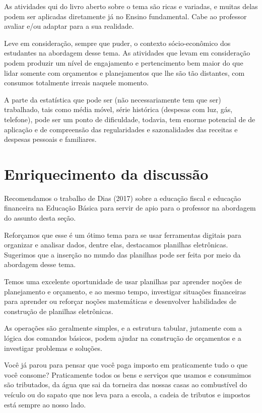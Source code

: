 \begin{paginatexto}
As atividades qui do livro aberto sobre o tema são ricas e variadas, e muitas delas podem ser aplicadas diretamente já no Ensino fundamental. Cabe ao professor avaliar e/ou adaptar para a sua realidade. 

Leve em consideração, sempre que puder, o contexto sócio-econômico dos estudantes na abordagem desse tema. As atividades que levam em consideração podem produzir um nível de engajamento e pertencimento bem maior do que lidar somente com orçamentos e planejamentos que lhe são tão distantes, com consumos totalmente irreais naquele momento. 

A parte da estatística que pode ser (não necessariamente tem que ser) trabalhado, tais como média móvel, série histórica (despesas com luz, gás, telefone), pode ser um ponto de dificuldade, todavia, tem enorme potencial de de aplicação e de compreensão das regularidades e sazonalidades das receitas e despesas pessoais e familiares.

\section*{Enriquecimento da discussão}

Recomendamos o trabalho de Dias (2017) sobre a educação fiscal e educação financeira na Educação Básica para servir de apio para o professor na abordagem do assunto desta seção.

Reforçamos que esse é um ótimo tema para se usar ferramentas digitais para organizar e analisar dados, dentre elas, destacamos planilhas eletrônicas. Sugerimos que a inserção no mundo das planilhas pode ser feita por meio da abordagem desse tema.

Temos uma excelente oportunidade de usar planilhas par aprender noções de planejamento e orçamento, e ao mesmo tempo, investigar situações financeiras para aprender ou reforçar noções matemáticas e desenvolver habilidades de construção de planilhas eletrônicas.

As operações são geralmente simples, e a estrutura tabular, jutamente com a lógica dos comandos básicos, podem ajudar na construção de orçamentos e a investigar problemas e soluções.
\end{paginatexto}

Você já parou para pensar que você paga imposto em praticamente tudo o que você consome? Praticamente todos os bens e serviços que usamos e consumimos são tributados, da água que sai da torneira das nossas casas ao combustível do veículo ou do sapato que nos leva para a escola, a cadeia de tributos e impostos está sempre ao nosso lado.

